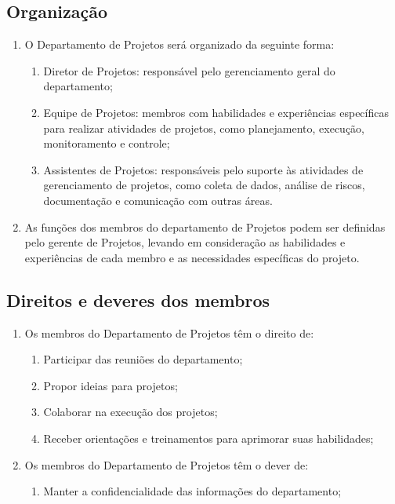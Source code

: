         \subsection{Organização}
        \begin{enumerate}
            \item O Departamento de Projetos será organizado da seguinte forma:
            \begin{enumerate}
                \item Diretor de Projetos: responsável pelo gerenciamento geral do departamento;
                \item Equipe de Projetos: membros com habilidades e experiências específicas para realizar atividades de projetos, como planejamento, execução, monitoramento e controle;
                \item Assistentes de Projetos: responsáveis pelo suporte às atividades de gerenciamento de projetos, como coleta de dados, análise de riscos, documentação e comunicação com outras áreas.
            \end{enumerate}
            \item As funções dos membros do departamento de Projetos podem ser definidas pelo gerente de Projetos, levando em consideração as habilidades e experiências de cada membro e as necessidades específicas do projeto.
        \end{enumerate}
        
        \subsection{Direitos e deveres dos membros}
        \begin{enumerate}
            \item Os membros do Departamento de Projetos têm o direito de:
            \begin{enumerate}
                \item Participar das reuniões do departamento;
                \item Propor ideias para projetos;
                \item Colaborar na execução dos projetos;
                \item Receber orientações e treinamentos para aprimorar suas habilidades;
            \end{enumerate} 
            \item  Os membros do Departamento de Projetos têm o dever de:
            \begin{enumerate}
                \item Manter a confidencialidade das informações do departamento;
            \end{enumerate}
        \end{enumerate}
    
